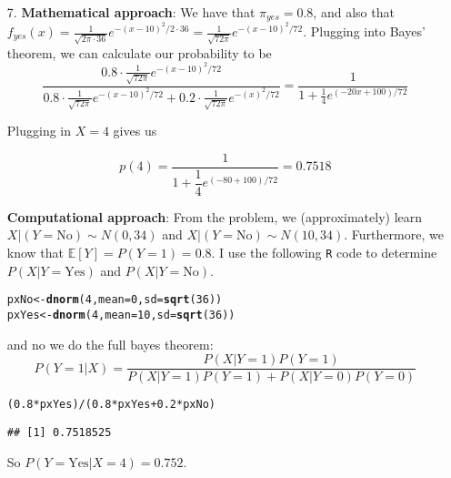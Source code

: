 \documentclass[11pt]{article}\usepackage[]{graphicx}\usepackage[]{color}
\makeatletter
\newcommand{\hlnum}[1]{\textcolor[rgb]{0.686,0.059,0.569}{#1}}%
\newcommand{\hlopt}[1]{\textcolor[rgb]{0,0,0}{#1}}%
\newcommand{\hlstd}[1]{\textcolor[rgb]{0.345,0.345,0.345}{#1}}%
\newcommand{\hlkwb}[1]{\textcolor[rgb]{0.69,0.353,0.396}{#1}}%
\newcommand{\hlkwc}[1]{\textcolor[rgb]{0.333,0.667,0.333}{#1}}%
\newcommand{\hlkwd}[1]{\textcolor[rgb]{0.737,0.353,0.396}{\textbf{#1}}}%
\newenvironment{kframe}{%
 \def\at@end@of@kframe{}%
 \ifinner\ifhmode%
  \def\at@end@of@kframe{\end{minipage}}%
  \begin{minipage}{\columnwidth}%
 \fi\fi%
 \def\FrameCommand##1{\hskip\@totalleftmargin \hskip-\fboxsep
 \colorbox{shadecolor}{##1}\hskip-\fboxsep
     \hskip-\linewidth \hskip-\@totalleftmargin \hskip\columnwidth}%
 \MakeFramed {\advance\hsize-\width
   \@totalleftmargin\z@ \linewidth\hsize
   \@setminipage}}%
 {\par\unskip\endMakeFramed%
 \at@end@of@kframe}
\newenvironment{knitrout}{}{} %
\makeatother
\begin{document}
\begin{enumerate}
\item[7.] \textbf{Mathematical approach}: We have that $\pi_{yes} = 0.8$, and also that $f_{yes}(x) = \frac{1}{\sqrt{2\pi \cdot 36}} e^{-(x-10)^2/2\cdot 36} = \frac{1}{\sqrt{72 \pi}} e^{-(x-10)^2/72}$. Plugging into Bayes' theorem, we can calculate our probability to be
\[ \dfrac{0.8\cdot  \frac{1}{\sqrt{72 \pi}} e^{-(x-10)^2/72}}    {0.8 \cdot \frac{1}{\sqrt{72 \pi}} e^{-(x-10)^2/72}+ 0.2 \cdot  \frac{1}{\sqrt{72 \pi}} e^{-(x)^2/72}} = \dfrac{1}{1 + \frac14 e^{(-20x + 100)/72}}\]

Plugging in $X = 4$ gives us 

\[p(4) = \dfrac{1}{1 + \dfrac14 e^{(-80 + 100)/72}} = 0.7518 \]

\textbf{Computational approach}: From the problem, we (approximately) learn $X|(Y = \text{No}) \sim N(0, 34)$ and $X|(Y = \text{No}) \sim N(10, 34)$. Furthermore, we know that $\mathbb{E}[Y] = P(Y = 1) = 0.8$. I use the following \texttt{R} code to determine $P(X| Y = \text{Yes})$ and $P(X | Y = \text{No})$.

\begin{knitrout}
\color{fgcolor}\begin{kframe}
\begin{alltt}
\hlstd{pxNo} \hlkwb{<-} \hlkwd{dnorm}\hlstd{(}\hlnum{4}\hlstd{,} \hlkwc{mean} \hlstd{=} \hlnum{0}\hlstd{,} \hlkwc{sd} \hlstd{=} \hlkwd{sqrt}\hlstd{(}\hlnum{36}\hlstd{))}
\hlstd{pxYes} \hlkwb{<-} \hlkwd{dnorm}\hlstd{(}\hlnum{4}\hlstd{,} \hlkwc{mean} \hlstd{=} \hlnum{10}\hlstd{,} \hlkwc{sd} \hlstd{=} \hlkwd{sqrt}\hlstd{(}\hlnum{36}\hlstd{))}
\end{alltt}
\end{kframe}
\end{knitrout}

and no we do the full bayes theorem: $$ P(Y = 1 | X) = \frac{P(X|Y = 1) P(Y = 1)}{ P(X|Y=1)P(Y = 1) + P(X | Y = 0)P(Y = 0)}$$


\begin{knitrout}
\color{fgcolor}\begin{kframe}
\begin{alltt}
\hlstd{(}\hlnum{0.8} \hlopt{*} \hlstd{pxYes)}\hlopt{/}\hlstd{(}\hlnum{0.8} \hlopt{*} \hlstd{pxYes} \hlopt{+} \hlnum{0.2} \hlopt{*} \hlstd{pxNo)}
\end{alltt}
\begin{verbatim}
## [1] 0.7518525
\end{verbatim}
\end{kframe}
\end{knitrout}

So $P(Y = \text{Yes} | X = 4) = 0.752$. 


\end{enumerate}
\end{document}
